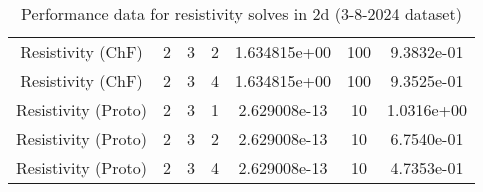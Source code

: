 \documentclass{article}
\begin{document}
\begin{small}
\begin{table}
\begin{center}
\begin{tabular}{|c|c|c|c|c|c||c|}
        Resistivity      (ChF) & 2 & 3 & 2& 1.634815e+00 & 100 & 9.3832e-01\\
        Resistivity      (ChF) & 2 & 3 & 4& 1.634815e+00 & 100 & 9.3525e-01\\
        Resistivity    (Proto) & 2 & 3 & 1& 2.629008e-13 & 10 & 1.0316e+00\\
        Resistivity    (Proto) & 2 & 3 & 2& 2.629008e-13 & 10 & 6.7540e-01\\
        Resistivity    (Proto) & 2 & 3 & 4& 2.629008e-13 & 10 & 4.7353e-01\\
        \hline 
      \end{tabular} 
    \end{center}   
    \label{tab::datareductiontable3102024.resist_2} 
    \caption{Performance data for  resistivity solves in 2d (3-8-2024 dataset)}

  \end{table} 
\end{small}
\end{document}
